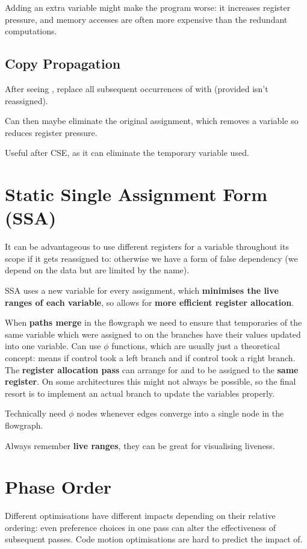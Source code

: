 \documentclass[a4paper, 11pt]{article}
\begin{document}
{{        Adding an extra variable might make the program worse: it increases register pressure, and memory accesses are often more expensive than the redundant computations.
    }
    \subsection*{Copy Propagation}
    {
        After seeing , replace all subsequent occurrences of  with  (provided  isn't reassigned).

        Can then maybe eliminate the original assignment, which removes a variable so reduces register pressure.

        Useful after CSE, as it can eliminate the temporary variable used.
    }
}
\section*{Static Single Assignment Form (SSA)}
{
    It can be advantageous to use different registers for a variable throughout its scope if it gets reassigned to: otherwise we have a form of false dependency (we depend on the data but are limited by the name).

    SSA uses a new variable for every assignment, which \textbf{minimises the live ranges of each variable}, so allows for \textbf{more efficient register allocation}.

    When \textbf{paths merge} in the flowgraph we need to ensure that temporaries of the same variable which were assigned to on the branches have their values updated into one variable. Can use \(\phi\) functions, which are usually just a theoretical concept:  means  if control took a left branch and  if control took a right branch. The \textbf{register allocation pass} can arrange for  and  to be assigned to the \textbf{same register}. On some architectures this might not always be possible, so the final resort is to implement an actual branch to update the variables properly.

    Technically need \(\phi\) nodes whenever edges converge into a single node in the flowgraph.

    Always remember \textbf{live ranges}, they can be great for visualising liveness.
}
\section*{Phase Order}
{
    Different optimisations have different impacts depending on their relative ordering: even preference choices in one pass can alter the effectiveness of subsequent passes. Code motion optimisations are hard to predict the impact of.
}
\end{document}
